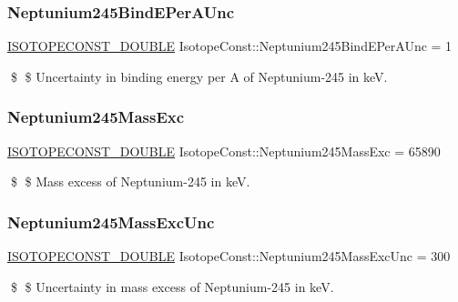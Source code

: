 \subsubsection{\texorpdfstring{Neptunium245\+Bind\+E\+Per\+A\+Unc}{Neptunium245BindEPerAUnc}}
{\footnotesize\ttfamily \mbox{\hyperlink{group___isotope_const-_macros_ga8f45a7272ce02c0b4c65c44636ed719a}{I\+S\+O\+T\+O\+P\+E\+C\+O\+N\+S\+T\+\_\+\+D\+O\+U\+B\+LE}} Isotope\+Const\+::\+Neptunium245\+Bind\+E\+Per\+A\+Unc = 1}

\$ \$ Uncertainty in binding energy per A of Neptunium-\/245 in keV. \mbox{\label{group___isotope_const-_neptunium-_np245_ga073e2e692ec0581de702a84b9db8c7c9}} 
\subsubsection{\texorpdfstring{Neptunium245\+Mass\+Exc}{Neptunium245MassExc}}
{\footnotesize\ttfamily \mbox{\hyperlink{group___isotope_const-_macros_ga8f45a7272ce02c0b4c65c44636ed719a}{I\+S\+O\+T\+O\+P\+E\+C\+O\+N\+S\+T\+\_\+\+D\+O\+U\+B\+LE}} Isotope\+Const\+::\+Neptunium245\+Mass\+Exc = 65890}

\$ \$ Mass excess of Neptunium-\/245 in keV. \mbox{\label{group___isotope_const-_neptunium-_np245_ga1282462d681c12195cbee808d567ae50}} 
\subsubsection{\texorpdfstring{Neptunium245\+Mass\+Exc\+Unc}{Neptunium245MassExcUnc}}
{\footnotesize\ttfamily \mbox{\hyperlink{group___isotope_const-_macros_ga8f45a7272ce02c0b4c65c44636ed719a}{I\+S\+O\+T\+O\+P\+E\+C\+O\+N\+S\+T\+\_\+\+D\+O\+U\+B\+LE}} Isotope\+Const\+::\+Neptunium245\+Mass\+Exc\+Unc = 300}

\$ \$ Uncertainty in mass excess of Neptunium-\/245 in keV. \mbox{\label{group___isotope_const-_neptunium-_np245_ga11b905e76484dded133e0172fc799dd5}} 
